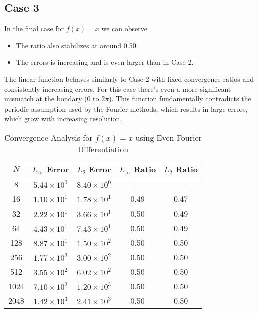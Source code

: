 \subsection{Case 3}
%
%
In the final case for $f(x) = x$ we can observe
\begin{itemize}
	\item The ratio also stabilizes at around 0.50.
	\item The errors is increasing and is even larger than in Case 2.
\end{itemize}
The linear function behaves similarly to Case 2 with fixed convergence ratios and consistently increasing errors. For this case there's even a more significant mismatch at the bondary ($0$ to $2\pi$). This function fundamentally contradicts the periodic assumption used by the Fourier methods, which results in large errors, which grow with increasing resolution.
\begin{table}[H]
	\centering
	\begin{tabular}{|c|c|c|c|c|}
		\hline
		$N$  & $L_\infty$ Error     & $L_2$ Error          & $L_\infty$ Ratio & $L_2$ Ratio \\
		\hline
		8    & $5.44 \times 10^{0}$ & $8.40 \times 10^{0}$ & ---              & ---         \\
		16   & $1.10 \times 10^{1}$ & $1.78 \times 10^{1}$ & 0.49             & 0.47        \\
		32   & $2.22 \times 10^{1}$ & $3.66 \times 10^{1}$ & 0.50             & 0.49        \\
		64   & $4.43 \times 10^{1}$ & $7.43 \times 10^{1}$ & 0.50             & 0.49        \\
		128  & $8.87 \times 10^{1}$ & $1.50 \times 10^{2}$ & 0.50             & 0.50        \\
		256  & $1.77 \times 10^{2}$ & $3.00 \times 10^{2}$ & 0.50             & 0.50        \\
		512  & $3.55 \times 10^{2}$ & $6.02 \times 10^{2}$ & 0.50             & 0.50        \\
		1024 & $7.10 \times 10^{2}$ & $1.20 \times 10^{3}$ & 0.50             & 0.50        \\
		2048 & $1.42 \times 10^{3}$ & $2.41 \times 10^{3}$ & 0.50             & 0.50        \\
		\hline
	\end{tabular}
	\caption{Convergence Analysis for $f(x) = x$ using Even Fourier Differentiation}
	\label{tab:linearx}
\end{table}
